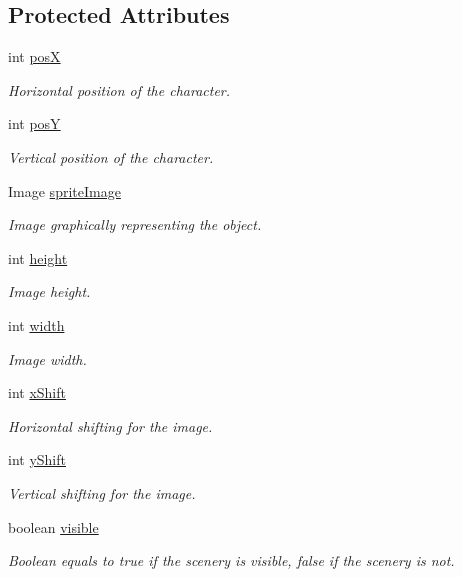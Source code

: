 \subsection*{Protected Attributes}
\begin{DoxyCompactItemize}
\item 
int \hyperlink{classworld_1_1character_1_1_character_a78ad3a5c111a39df2ba12b542fa175b4}{pos\-X}
\begin{DoxyCompactList}\small\item\em Horizontal position of the character. \end{DoxyCompactList}\item 
int \hyperlink{classworld_1_1character_1_1_character_a1e81a73a02b73e6f1608ba3c1b6d83ef}{pos\-Y}
\begin{DoxyCompactList}\small\item\em Vertical position of the character. \end{DoxyCompactList}\item 
Image \hyperlink{classworld_1_1scenery_1_1_scenery_a512d9c0a154e6843389e343d80843326}{sprite\-Image}
\begin{DoxyCompactList}\small\item\em Image graphically representing the object. \end{DoxyCompactList}\item 
int \hyperlink{classworld_1_1scenery_1_1_scenery_a54b4edfa060087e78a829105bf62a900}{height}
\begin{DoxyCompactList}\small\item\em Image height. \end{DoxyCompactList}\item 
int \hyperlink{classworld_1_1scenery_1_1_scenery_ad10b27080954e2fc06aa1718f47c4ce1}{width}
\begin{DoxyCompactList}\small\item\em Image width. \end{DoxyCompactList}\item 
int \hyperlink{classworld_1_1scenery_1_1_scenery_a0999f105f7630fd67fd9d440da6983aa}{x\-Shift}
\begin{DoxyCompactList}\small\item\em Horizontal shifting for the image. \end{DoxyCompactList}\item 
int \hyperlink{classworld_1_1scenery_1_1_scenery_ac9ca2c17cf6920deffe490c013b0e638}{y\-Shift}
\begin{DoxyCompactList}\small\item\em Vertical shifting for the image. \end{DoxyCompactList}\item 
boolean \hyperlink{classworld_1_1scenery_1_1_scenery_a7b22a78d3126c947b7010fdbbea02218}{visible}
\begin{DoxyCompactList}\small\item\em Boolean equals to true if the scenery is visible, false if the scenery is not. \end{DoxyCompactList}\end{DoxyCompactItemize}
